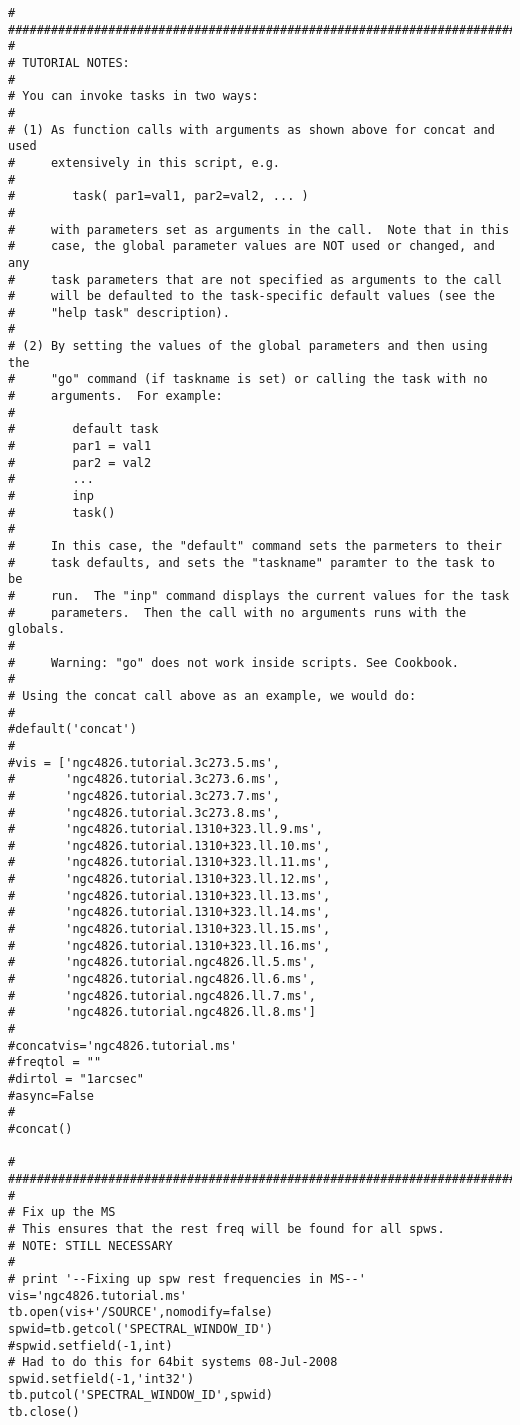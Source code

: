 \begin{verbatim}
#
##########################################################################
#
# TUTORIAL NOTES:
#
# You can invoke tasks in two ways:
#
# (1) As function calls with arguments as shown above for concat and used
#     extensively in this script, e.g.
#
#        task( par1=val1, par2=val2, ... )
#
#     with parameters set as arguments in the call.  Note that in this
#     case, the global parameter values are NOT used or changed, and any
#     task parameters that are not specified as arguments to the call
#     will be defaulted to the task-specific default values (see the
#     "help task" description).
#
# (2) By setting the values of the global parameters and then using the
#     "go" command (if taskname is set) or calling the task with no
#     arguments.  For example:
#
#        default task
#        par1 = val1
#        par2 = val2
#        ...
#        inp
#        task()
#
#     In this case, the "default" command sets the parmeters to their
#     task defaults, and sets the "taskname" paramter to the task to be
#     run.  The "inp" command displays the current values for the task
#     parameters.  Then the call with no arguments runs with the globals.
#
#     Warning: "go" does not work inside scripts. See Cookbook.
#
# Using the concat call above as an example, we would do:
#
#default('concat')
#
#vis = ['ngc4826.tutorial.3c273.5.ms',
#       'ngc4826.tutorial.3c273.6.ms',
#       'ngc4826.tutorial.3c273.7.ms',
#       'ngc4826.tutorial.3c273.8.ms',
#       'ngc4826.tutorial.1310+323.ll.9.ms',
#       'ngc4826.tutorial.1310+323.ll.10.ms',
#       'ngc4826.tutorial.1310+323.ll.11.ms',
#       'ngc4826.tutorial.1310+323.ll.12.ms',
#       'ngc4826.tutorial.1310+323.ll.13.ms',
#       'ngc4826.tutorial.1310+323.ll.14.ms',
#       'ngc4826.tutorial.1310+323.ll.15.ms',
#       'ngc4826.tutorial.1310+323.ll.16.ms',	    
#       'ngc4826.tutorial.ngc4826.ll.5.ms',
#       'ngc4826.tutorial.ngc4826.ll.6.ms',
#       'ngc4826.tutorial.ngc4826.ll.7.ms',
#       'ngc4826.tutorial.ngc4826.ll.8.ms']
#
#concatvis='ngc4826.tutorial.ms'
#freqtol = ""
#dirtol = "1arcsec"
#async=False
#
#concat()

#
##########################################################################
#
# Fix up the MS
# This ensures that the rest freq will be found for all spws. 
# NOTE: STILL NECESSARY
#
# print '--Fixing up spw rest frequencies in MS--'
vis='ngc4826.tutorial.ms'
tb.open(vis+'/SOURCE',nomodify=false)
spwid=tb.getcol('SPECTRAL_WINDOW_ID')
#spwid.setfield(-1,int)
# Had to do this for 64bit systems 08-Jul-2008
spwid.setfield(-1,'int32')
tb.putcol('SPECTRAL_WINDOW_ID',spwid)
tb.close()


\end{verbatim}
